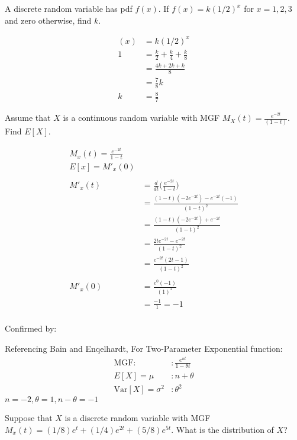 \documentclass[answers]{exam}
\begin{document}
\begin{questions}
\question
A discrete random variable has pdf $f(x)$. If $f(x)=k(1/2)^x$ for $x=1,2,3$ and zero otherwise, find $k$.

\begin{solution}
	\begin{align*}
		(x) &= k(1/2)^x \\
		1 &= \frac{k}{2} + \frac{k}{4} + \frac{k}{8} \\
		&= \frac{4k + 2k + k}{8} \\
		&= \frac{7}{8}k \\
		k &= \frac{8}{7}
	\end{align*}
\end{solution}


\question
Assume that $X$ is a continuous random variable with MGF $M_X(t)= \frac{e^{−2t}}{(1−t)}$. \\ Find $E[X]$.
 
 \begin{solution}
 	\begin{align*}
 		M_x(t) = \frac{e^{-2t}}{1-t} \\
 		E[x] = M'_x(0) \\
 		\\
 		M'_x(t) &= \frac{d}{dt}\bigg(\frac{e^{-2t}}{1-t}\bigg) \\
 		&= \frac{(1-t)(-2e^{-2t})-e^{-2t}(-1) }{ (1-t)^2} \\
 		&= \frac{(1-t)(-2e^{-2t})+e^{-2t}  }{  (1-t)^2} \\
 		&= \frac{2te^{-2t} -e^{-2t}  }{  (1-t)^2} \\
 		&= \frac{e^{-2t}(2t-1) }{  (1-t)^2} \\
 		\\
 		M'_x(0) &= \frac{e^{0}(-1) }{  (1)^2} \\
 		&= \frac{-1}{1} = -1\\
 	\end{align*}
 	
 	Confirmed by:
 	
	 Referencing Bain and Enqelhardt,
	 For Two-Parameter Exponential function:
	 \begin{align*}
	 	\text{MGF:} &: \frac{e^{nt}}{1-\theta t} \\
	 	E[X] = \mu &: n + \theta \\
	 	\text{Var}[X] = \sigma^2 &: \theta^2
	 \end{align*}
	 $n = -2, \theta = 1, n-\theta = -1$
\end{solution}


\question 
Suppose that $X$ is a discrete random variable with MGF $M_x(t) = (1/8)e^t+(1/4)e^{2t}+(5/8)e^{5t}$.  What is the distribution of $X$?


\end{questions}
\end{document}
